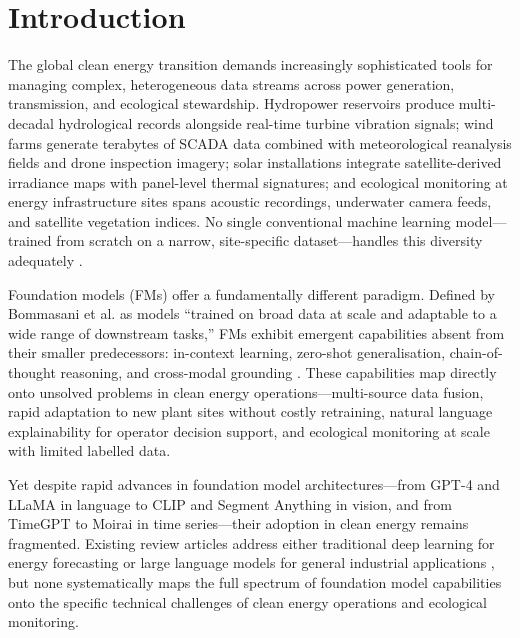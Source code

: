 \documentclass[preprint,12pt]{elsarticle}
\begin{document}
\section{Introduction}
\label{sec:introduction}

The global clean energy transition demands increasingly sophisticated tools for managing complex, heterogeneous data streams across power generation, transmission, and ecological stewardship. Hydropower reservoirs produce multi-decadal hydrological records alongside real-time turbine vibration signals; wind farms generate terabytes of SCADA data combined with meteorological reanalysis fields and drone inspection imagery; solar installations integrate satellite-derived irradiance maps with panel-level thermal signatures; and ecological monitoring at energy infrastructure sites spans acoustic recordings, underwater camera feeds, and satellite vegetation indices. No single conventional machine learning model---trained from scratch on a narrow, site-specific dataset---handles this diversity adequately \cite{wang2019dl_renewable_forecasting}.

Foundation models (FMs) offer a fundamentally different paradigm. Defined by Bommasani et al. \cite{bommasani2021opportunities} as models ``trained on broad data at scale and adaptable to a wide range of downstream tasks,'' FMs exhibit emergent capabilities absent from their smaller predecessors: in-context learning, zero-shot generalisation, chain-of-thought reasoning, and cross-modal grounding \cite{wei2022emergent}. These capabilities map directly onto unsolved problems in clean energy operations---multi-source data fusion, rapid adaptation to new plant sites without costly retraining, natural language explainability for operator decision support, and ecological monitoring at scale with limited labelled data.

Yet despite rapid advances in foundation model architectures---from GPT-4 \cite{achiam2023gpt4} and LLaMA \cite{touvron2023llama2} in language to CLIP \cite{radford2021learning} and Segment Anything \cite{kirillov2023sam} in vision, and from TimeGPT to Moirai \cite{woo2024moirai} in time series---their adoption in clean energy remains fragmented. Existing review articles address either traditional deep learning for energy forecasting \cite{wang2019dl_renewable_forecasting, ahmed2020wind_forecasting_review} or large language models for general industrial applications \cite{zhao2023llm_survey, minaee2024llm_survey}, but none systematically maps the full spectrum of foundation model capabilities onto the specific technical challenges of clean energy operations and ecological monitoring.
\end{document}
